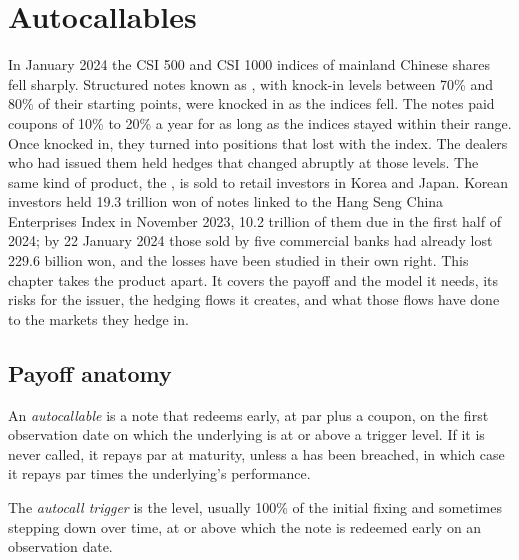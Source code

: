 \chapter{Autocallables}\label{ch:dv:autocallables}

In January 2024 the CSI 500 and CSI 1000 indices of mainland Chinese shares fell sharply. Structured notes known as
, with knock-in levels between 70\% and 80\% of their starting points, were knocked in as the indices fell. The
notes paid coupons of 10\% to 20\% a year for as long as the indices stayed within their range. Once knocked in, they turned into positions that lost with the index. The dealers who had issued them held
hedges that changed abruptly at those levels. The same kind of product, the , is sold to retail investors in
Korea and Japan. Korean investors held 19.3 trillion won of notes linked to the Hang Seng China Enterprises Index in
November 2023, 10.2 trillion of them due in the first half of 2024; by 22 January 2024 those sold by five commercial banks had
already lost 229.6 billion won, and the losses have been studied in their own right. This chapter takes the product apart. It covers the payoff and the model it needs, its risks for the
issuer, the hedging flows it creates, and what those flows have done to the markets they hedge in.

\section{Payoff anatomy}

\begin{definition}[Autocallable]\label{def:dv:autocallables:autocallable}
An \emph{autocallable} is a note that redeems early, at par plus a coupon, on the first observation
date on which the underlying is at or above a trigger level. If it is never called, it repays par at maturity, unless a
 has been breached, in which case it repays par times the underlying's performance.
\end{definition}

\begin{definition}\label{def:dv:autocallables:trigger}
The \emph{autocall trigger} is the level, usually 100\% of the initial fixing and sometimes
stepping down over time, at or above which the note is redeemed early on an observation date.
\end{definition}

